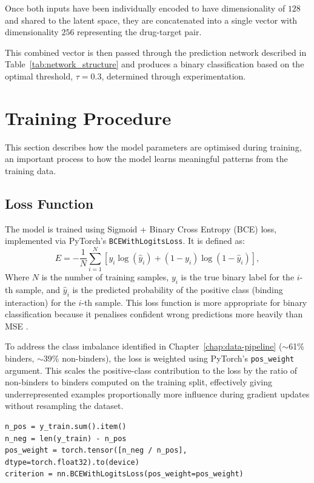 Once both inputs have been individually encoded to have dimensionality of $128$ and shared to the latent space, they are concatenated into a single vector with dimensionality $256$ representing the drug-target pair.

This combined vector is then passed through the prediction network described in Table~\ref{tab:network_structure} and produces a binary classification based on the optimal threshold, $\tau = 0.3$, determined through experimentation.

\section{Training Procedure}
This section describes how the model parameters are optimised during training, an important process to how the model learns meaningful patterns from the training data.
\subsection{Loss Function}
The model is trained using Sigmoid + Binary Cross Entropy (BCE) loss, implemented via PyTorch's \texttt{BCEWithLogitsLoss}.
It is defined as:
\[
    E = -\frac{1}{N} \sum_{i=1}^{N} \left[ y_i \log(\hat{y}_i) + (1 - y_i) \log(1 - \hat{y}_i) \right],
\]
Where $N$ is the number of training samples, $y_i$ is the true binary label for the $i$-th sample, and $\hat{y}_i$ is the predicted probability of the positive class (binding interaction) for the $i$-th sample.
This loss function is more appropriate for binary classification because it penalises confident wrong predictions more heavily than MSE \citep{goodfellow2016deep}.

To address the class imbalance identified in Chapter~\ref{chap:data-pipeline} ($\sim$61\% binders, $\sim$39\% non-binders), the loss is weighted using PyTorch's \texttt{pos\_weight} argument.
This scales the positive-class contribution to the loss by the ratio of non-binders to binders computed on the training split, effectively giving underrepresented examples proportionally more influence during gradient updates without resampling the dataset.
\begin{lstlisting}[caption={class-imbalance weighting for BCEWithLogitsLoss}]
n_pos = y_train.sum().item()
n_neg = len(y_train) - n_pos
pos_weight = torch.tensor([n_neg / n_pos], dtype=torch.float32).to(device)
criterion = nn.BCEWithLogitsLoss(pos_weight=pos_weight)
\end{lstlisting}

